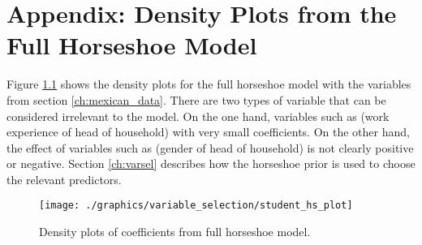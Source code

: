 \chapter{Appendix: Density Plots from the Full Horseshoe Model}
\label{appendix:horseshoe_plot}

Figure \ref{fig:hs_dens} shows the density plots for the full horseshoe model with the variables from section \ref{ch:mexican_data}.
There are two types of variable that can be considered irrelevant to the model.
On the one hand, variables such as  (work experience of head of household) with very small coefficients.
On the other hand, the effect of variables such as  (gender of head of household) is not clearly positive or negative.
Section \ref{ch:varsel} describes how the horseshoe prior is used to choose the relevant predictors.

\begin{figure}[h]
    \texttt{[image: ./graphics/variable\_selection/student\_hs\_plot]}
    \caption{Density plots of coefficients from full horseshoe model.}
    \label{fig:hs_dens}
\end{figure}
